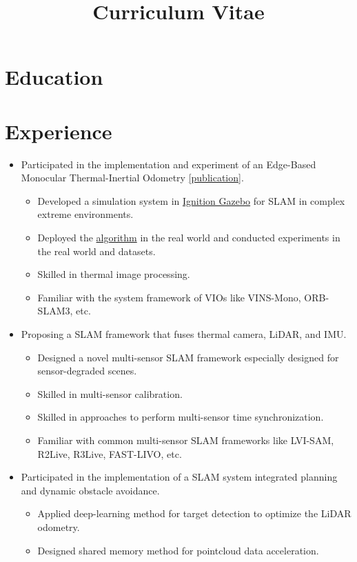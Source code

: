 \documentclass[11pt,a4paper]{moderncv}        %
\title{Curriculum Vitae}
\begin{document}

\makecvtitle 

\section{Education}


\section{Experience}

%
{
\begin{itemize}%
\item Participated in the implementation and experiment of an Edge-Based Monocular Thermal-Inertial Odometry \hyperref[sec:Publications]{[publication]}.
\begin{itemize}%
\hypersetup{urlcolor=black}
\item Developed a simulation system in \href{https://gazebosim.org/api/gazebo/2.10/index.html}{Ignition Gazebo} for SLAM in complex extreme environments.
\item Deployed the \hyperref[sec:Publications]{algorithm} in the real world and conducted experiments in the real world and datasets.
\item Skilled in thermal image processing.
\item Familiar with the system framework of VIOs like VINS-Mono, ORB-SLAM3, etc.
\end{itemize}
\item Proposing a SLAM framework that fuses thermal camera, LiDAR, and IMU.
\begin{itemize}%
\item Designed a novel multi-sensor SLAM framework especially designed for sensor-degraded scenes. 
\item Skilled in multi-sensor calibration.
\item Skilled in approaches to perform multi-sensor time synchronization.
\item Familiar with common multi-sensor SLAM frameworks like LVI-SAM, R2Live, R3Live, FAST-LIVO, etc.
\end{itemize}
\item Participated in the implementation of a SLAM system integrated planning and dynamic obstacle avoidance.
\begin{itemize}%
\item Applied deep-learning method for target detection to optimize the LiDAR odometry.
\item Designed shared memory method for pointcloud data acceleration.
\end{itemize}
\end{itemize}
}
\end{document}
